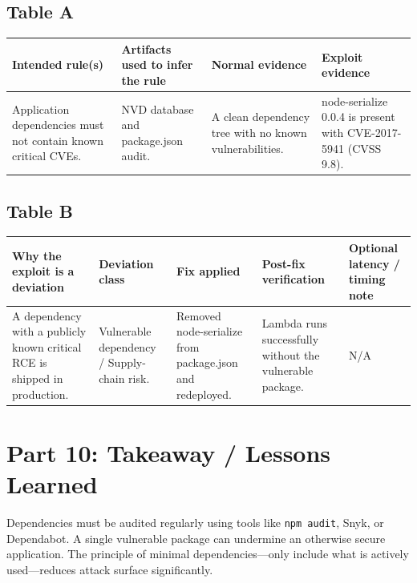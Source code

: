 \documentclass[12pt]{report}
\begin{document}
\subsection*{Table A}
\begin{table}[H]
  \small
  \centering
  \begin{tabularx}{\textwidth}{|Y|Y|Y|Y|}
    \hline
    \textbf{Intended rule(s)} & \textbf{Artifacts used to infer the rule} & \textbf{Normal evidence} & \textbf{Exploit evidence} \\
    \hline
    Application dependencies must not contain known critical CVEs. &
    NVD database and package.json audit. &
    A clean dependency tree with no known vulnerabilities. &
    node-serialize 0.0.4 is present with CVE-2017-5941 (CVSS 9.8). \\
    \hline
  \end{tabularx}
\end{table}

\subsection*{Table B}
\begin{table}[H]
  \footnotesize
  \centering
  \begin{tabularx}{\textwidth}{|Y|Y|Y|Y|Y|}
    \hline
    \textbf{Why the exploit is a deviation} & \textbf{Deviation class} & \textbf{Fix applied} & \textbf{Post-fix verification} & \textbf{Optional latency / timing note} \\
    \hline
    A dependency with a publicly known critical RCE is shipped in production. &
    Vulnerable dependency / Supply-chain risk. &
    Removed node-serialize from package.json and redeployed. &
    Lambda runs successfully without the vulnerable package. &
    N/A \\
    \hline
  \end{tabularx}
\end{table}

\section{Part 10: Takeaway / Lessons Learned}
Dependencies must be audited regularly using tools like \texttt{npm audit}, Snyk, or Dependabot. A single vulnerable package can undermine an otherwise secure application. The principle of minimal dependencies---only include what is actively used---reduces attack surface significantly.

\clearpage
\end{document}
